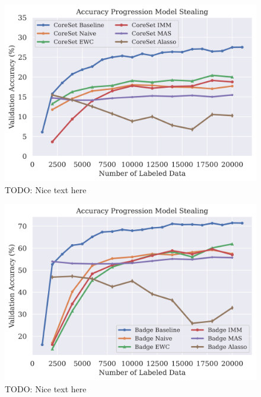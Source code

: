 \begin{figure}[h]
    \centering
    \includegraphics[width=0.8\linewidth]{images/results_CALMS/cifar100_softmax_coreset.png}
    \caption[Accuracy Comparison for Model Stealing on CIFAR10 using the softmax output and the Active Learning strategy CoreSet]{TODO: Nice text here}
    \label{fig:CALMSCIFAR10SoftmaxCoreSet}
\end{figure}

\begin{figure}[h]
    \centering
    \includegraphics[width=0.8\linewidth]{images/results_CALMS/cifar_softmax_badge.png}
    \caption[Accuracy Comparison for Model Stealing on CIFAR10 using the softmax output and the Active Learning strategy Badge]{TODO: Nice text here}
    \label{fig:CALMSCIFAR10SoftmaxBadge}
\end{figure}


